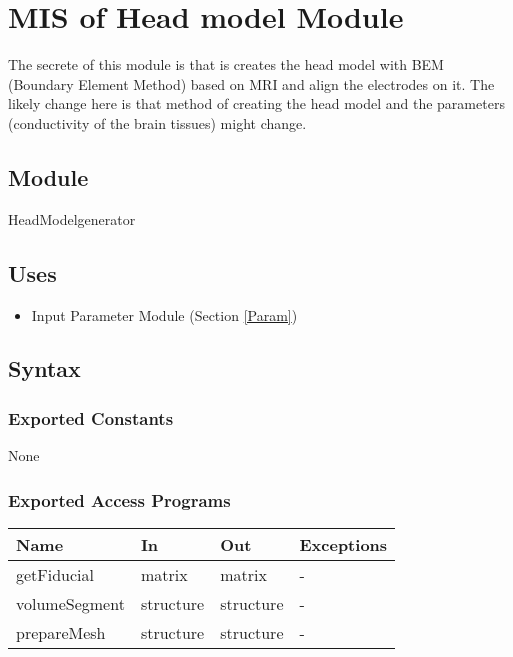 \documentclass[12pt, titlepage]{article}
\begin{document}
\section{MIS of Head model Module} \label{HM} 

The secrete of this module is that is creates the head model with BEM (Boundary Element Method) based on MRI and align the electrodes on it. The likely change here is that method of creating the head model and the parameters (conductivity of the brain tissues) might change.


\subsection{Module}

HeadModelgenerator

\subsection{Uses}

\begin{itemize}
\item Input Parameter Module (Section \ref{Param})
\end{itemize}

\subsection{Syntax}

\subsubsection{Exported Constants}
None
\subsubsection{Exported Access Programs}

\begin{center}
\begin{tabular}{p{4cm} p{3cm} p{3cm} p{2cm}}
\hline
\textbf{Name} & \textbf{In} & \textbf{Out} & \textbf{Exceptions} \\
\hline
getFiducial & matrix & matrix & - \\
volumeSegment & structure & structure& -\\
prepareMesh & structure & structure& -\\
\hline
\end{tabular}
\end{center}
\end{document}
